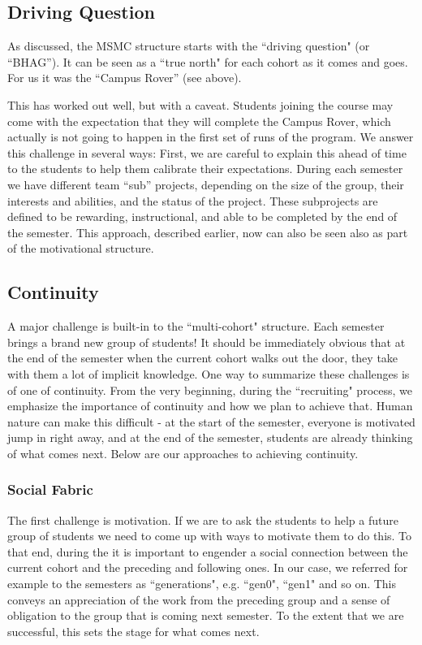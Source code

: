 \subsection{Driving Question} As discussed, the MSMC structure starts with the ``driving question" (or ``BHAG''). It can be seen as a  ``true north" for each cohort as it comes and goes. For us it was the ``Campus Rover'' (see above). 

This has worked out well, but with a caveat. Students joining the course may come with the expectation that they will complete the Campus Rover, which actually is not going to happen in the first set of runs of the program. We answer this challenge in several ways: First, we are careful to explain this ahead of time to the students to help them calibrate their expectations. During each semester we have different team ``sub'' projects, depending on the size of the group, their interests and abilities, and the status of the project. These subprojects are defined to be rewarding, instructional, and able to be completed by the end of the semester. This approach, described earlier, now can also be seen also as part of the motivational structure.

\subsection{Continuity}A major challenge is built-in to the ``multi-cohort" structure. Each semester brings a brand new group of students! It should be immediately obvious that at the end of the semester when the current cohort walks out the door, they take with them a lot of implicit knowledge. One way to summarize these challenges is of one of continuity. From the very beginning, during the ``recruiting" process, we emphasize the importance of continuity and how we plan to achieve that. Human nature can make this difficult - at the start of the semester, everyone is motivated jump in right away, and at the end of the semester, students are already thinking of what comes next. Below are our approaches to achieving continuity.

\subsubsection{Social Fabric}The first challenge is motivation. If we are to ask the students to help a future group of students we need to come up with ways to motivate them to do this. To that end, during the it is important to engender a social connection between the current cohort and the preceding and following ones. In our case, we referred for example to the semesters as ``generations", e.g. ``gen0", ``gen1" and so on. This conveys an appreciation of the work from the preceding group and a sense of obligation to the group that is coming next semester. To the extent that we are successful, this sets the stage for what comes next. 

